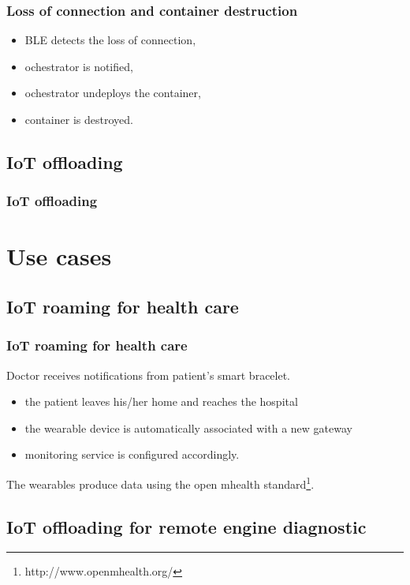 \documentclass{beamer}
\begin{document}
\begin{frame}
\frametitle{Loss of connection and container destruction}

  \begin{itemize}
    \item BLE detects the loss of connection,
    \item ochestrator is notified,
    \item ochestrator undeploys the container,
    \item container is destroyed.
  \end{itemize}
    
\end{frame}

\subsection{IoT offloading}

\begin{frame}
\frametitle{IoT offloading}

 
\end{frame}


\section{Use cases}

\subsection{IoT roaming for health care}

\begin{frame}
\frametitle{IoT roaming for health care}

  Doctor receives notifications from patient's smart bracelet.
  \begin{itemize}
    \item the patient leaves his/her home and reaches the hospital
    \item the wearable device is automatically associated with a new gateway 
    \item monitoring service is configured accordingly.
  \end{itemize}

The wearables produce data using the open mhealth standard\footnote{http://www.openmhealth.org/}.
    
\end{frame}

\subsection{IoT offloading for remote engine diagnostic}
\end{document}
